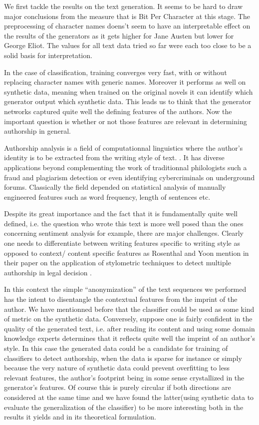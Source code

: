 We first tackle the results on the text generation. It seems to be hard to draw
major conclusions from the measure that is Bit Per Character at this stage. The
preprocessing of character names doens't seem to have an interpretable effect
on the results of the generators as it gets higher for Jane Austen but lower
for George Eliot. The values for all text data tried so far were each too close
to be a solid basis for interpretation.

In the case of classification, training converges very fast, with
or without replacing character names with generic names. Moreover
it performs as well on synthetic data, meaning when trained on 
the original novels it can identify which generator output which
synthetic data. This leads us to think that the generator networks
captured quite well the defining features of the authors. Now the 
important question is whether or not those features are relevant
in determining authorship in general.

Authorship analysis is a field of computationnal linguistics where
the author's identity is to be extracted from the writing style of text.
\cite{stylo}. It has diverse applications beyond complementing the
work of traditionnal philologists such a fraud and plagiarism detection
or even identifying cybercriminals on underground forums\cite{doppel}.
Classically the field depended on statistical analysis 
of manually engineered features such as word frequency, length of 
sentences etc. 

Despite its great importance and the fact that it is fundamentally
quite well defined, i.e. the question who wrote this text
is more well posed than the ones concerning sentiment analysis for
example, there are major challenges. Clearly one needs to differentiate
between writing features specific to writing style as opposed to
context/ content specific features as Rosenthal and Yoon mention in 
their paper on the application of stylometric techniques to detect
multiple authorship in legal decision .

In this context the simple ``anonymization'' of the text sequences we performed
has the intent to disentangle the contextual features from the imprint of the
author. We have mentionned before that the classifier could be used as some
kind of metric on the synthetic data. Conversely, suppose one is fairly
confident in the quality of the generated text, i.e. after reading its content
and using some domain knowledge experts determines that it reflects quite well
the imprint of an author's style. In this case the generated data could be a
candidate for training of classifiers to detect authorship, when the data is
sparse for instance or simply because the very nature of synthetic data could
prevent overfitting to less relevant features, the author's footprint being in
some sense crystallized in the generator's features. Of course this is purely
circular if both directions are considered at the same time and we have found
the latter(using synthetic data to evaluate the generalization of the
classifier) to be more interesting both in the results it yields and in its
theoretical formulation.


